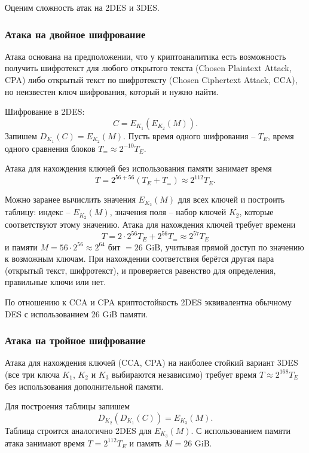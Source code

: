 Оценим сложность атак на 2DES и 3DES.

\subsubsection{Атака на двойное шифрование}


Атака основана на предположении, что у криптоаналитика есть возможность получить шифротекст для любого открытого текста (Chosen Plaintext Attack, CPA) либо открытый текст по шифротексту (Chosen Ciphertext Attack, CCA), но неизвестен ключ шифрования, который и нужно найти.

Шифрование в 2DES:
    \[ C = E_{K_1}( E_{K_2}(M)). \]
Запишем $D_{K_1}(C) = E_{K_2}(M)$. Пусть время одного шифрования -- $T_E$, время одного сравнения блоков $T_{=} \approx 2^{-10} T_E$.

Атака для нахождения ключей без использования памяти занимает время
    \[ T = 2^{56 + 56} (T_E + T_{=}) \approx 2^{112} T_E. \]

Можно заранее вычислить значения $E_{K_2}(M)$ для всех ключей и построить таблицу: индекс -- $E_{K_2}(M)$, значения поля -- набор ключей $K_2$, которые соответствуют этому значению. Атака для нахождения ключей требует времени
    \[ T = 2 \cdot 2^{56} T_E + 2^{56} T_{=} \approx 2^{57} T_E \]
и памяти $M = 56 \cdot 2^{56} \approx 2^{64}$ бит $= 26$ GiB, учитывая прямой доступ по значению к возможным ключам. При нахождении соответствия берётся другая пара (открытый текст, шифротекст), и проверяется равенство для определения, правильные ключи или нет.

По отношению к CCA и CPA криптостойкость 2DES эквивалентна обычному DES с использованием 26 GiB памяти.

\subsubsection{Атака на тройное шифрование}

Атака для нахождения ключей (CCA, CPA) на наиболее стойкий вариант 3DES (все три ключа $K_1$, $K_2$ и $K_3$ выбираются независимо) требует время $T \approx 2^{168} T_E$ без использования дополнительной памяти.

Для построения таблицы запишем
    \[ D_{K_2}( D_{K_1}( C)) = E_{K_3} (M). \]
Таблица строится аналогично 2DES для $E_{K_3}(M)$. С использованием памяти атака занимают время $T = 2^{112} T_E$ и память $M = 26$ GiB.
